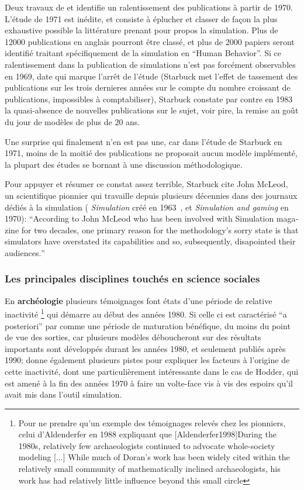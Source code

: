 Deux travaux de \textcite{Dutton1971} et \textcite{Starbuck1983} identifie un ralentissement des publications à partir de 1970. L'étude de 1971 est inédite, et consiste à éplucher et classer de façon la plus exhaustive possible la littérature prenant pour propos la simulation. Plus de 12000 publications en anglais pourront être classé, et plus de 2000 papiers seront identifié traitant spécifiquement de la simulation en \foreignquote{english}{Human Behavior}. Si ce ralentissement dans la publication de simulations n'est pas forcément observables en 1969, date qui marque l'arrêt de l'étude (Starbuck met l'effet de tassement des publications sur les trois dernieres années sur le compte du nombre croissant de publications, impossibles à comptabiliser), Starbuck constate par contre en 1983 la quasi-absence de nouvelles publications sur le sujet, voir pire, la remise au goût du jour de modèles de plus de 20 ans.

Une surprise qui finalement n'en est pas une, car dans l'étude de Starbuck en 1971, moins de la moitié des publications ne proposait aucun modèle implémenté, la plupart des études se bornant à une discussion méthodologique.

Pour appuyer et résumer ce constat assez terrible, Starbuck cite John McLeod, un scientifique pionnier qui travaille depuis plusieurs décennies dans des journaux dédiés à la simulation ( \textit{Simulation} créé en 1963 , et \textit{Simulation and gaming} en 1970): \foreignquote{english}{According to  John McLeod who has been involved with Simulation magazine for two decades, one primary reason for the methodology's sorry state is that simulators have overstated its capabilities and so, subsequently, disapointed their audiences.}

\subsubsection{Les principales disciplines touchés en science sociales}
\label{ssec:disciplines_touches}

En \textbf{archéologie} plusieurs témoignages \autocite[6-7]{Lake2013} font états d'une période de relative inactivité \footnote{Pour ne prendre qu'un exemple des témoignages relevés chez les pionniers, celui d'Aldenderfer en 1988 expliquant que [Aldenderfer1998]{During the 1980s, relatively few archaeologists continued to advocate whole-society modeling [...] While much of Doran's work has been widely cited within the relatively small community of mathematically inclined archaeologists, his work has had relatively little influence beyond this small circle}} qui démarre au début des années 1980. Si celle ci est caractérisé \enquote{a posteriori} par \autocite{Lake2013} comme une période de maturation bénéfique, du moins du point de vue des sorties, car plusieurs modèles déboucheront sur des résultats importants sont développés durant les années 1980, et seulement publiés après 1990; \autocite{Lake2013} donne également plusieurs pistes pour expliquer les facteurs à l'origine de cette inactivité, dont une particulièrement intéressante dans le cas de Hodder, qui est amené à la fin des années 1970 à faire un volte-face vis à vis des espoirs qu'il avait mis dans l'outil simulation.

